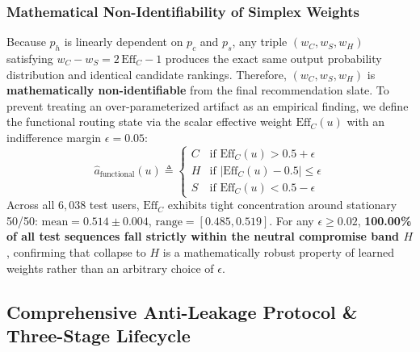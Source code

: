 \subsubsection{Mathematical Non-Identifiability of Simplex Weights}
Because $p_h$ is linearly dependent on $p_c$ and $p_s$, any triple $(w_C, w_S, w_H)$ satisfying $w_C - w_S = 2\,\text{Eff}_C - 1$ produces the exact same output probability distribution and identical candidate rankings. Therefore, $(w_C, w_S, w_H)$ is \textbf{mathematically non-identifiable} from the final recommendation slate.
To prevent treating an over-parameterized artifact as an empirical finding, we define the functional routing state via the scalar effective weight $\text{Eff}_C(u)$ with an indifference margin $\epsilon = 0.05$:
\begin{equation}
    \hat{a}_{\text{functional}}(u) \triangleq \begin{cases} C & \text{if } \text{Eff}_C(u) > 0.5 + \epsilon \\ H & \text{if } |\text{Eff}_C(u) - 0.5| \le \epsilon \\ S & \text{if } \text{Eff}_C(u) < 0.5 - \epsilon \end{cases}
\end{equation}
Across all $6{,}038$ test users, $\text{Eff}_C$ exhibits tight concentration around stationary 50/50: $\text{mean} = 0.514 \pm 0.004$, $\text{range} = [0.485, 0.519]$. For any $\epsilon \ge 0.02$, \textbf{100.00\% of all test sequences fall strictly within the neutral compromise band $H$}, confirming that collapse to $H$ is a mathematically robust property of learned weights rather than an arbitrary choice of $\epsilon$.

\subsection{Comprehensive Anti-Leakage Protocol \& Three-Stage Lifecycle}
\label{sec:anti_leakage}

